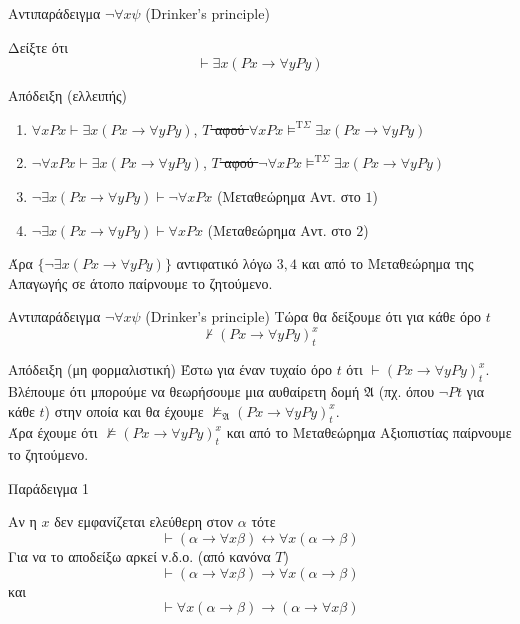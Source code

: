 \documentclass{beamer}
\begin{document}
\begin{frame}{Αντιπαράδειγμα $\neg\forall x \psi$ (Drinker's principle)}
  \begin{block}{}
  Δείξτε ότι
  \[
    \vdash \exists x (Px \rightarrow \forall y Py)
  \]
  \end{block}
  \begin{block}{Απόδειξη (ελλειπής)}
    \begin{enumerate}
      \item $\forall x Px \vdash \exists x (Px \rightarrow \forall y Py)$, \st{$T$ αφού $\forall x Px \models^{\textrm{T}\Sigma} \exists x (Px \rightarrow \forall y Py)$}
      \item $\neg\forall x Px \vdash \exists x (Px \rightarrow \forall y Py)$, \st{$T$ αφού $\neg\forall x Px \models^{\textrm{T}\Sigma} \exists x (Px \rightarrow \forall y Py)$}
      \item $\neg\exists x (Px \rightarrow \forall y Py) \vdash \neg\forall x Px$ (Μεταθεώρημα Αντ. στο $1$)
      \item $\neg\exists x (Px \rightarrow \forall y Py) \vdash \forall x Px$ (Μεταθεώρημα Αντ. στο $2$)
    \end{enumerate}
    Άρα $\{\neg\exists x (Px \rightarrow \forall y Py)\}$ αντιφατικό λόγω $3,4$ και από το Μεταθεώρημα της Απαγωγής σε άτοπο παίρνουμε το ζητούμενο.
  \end{block}
\end{frame}

\begin{frame}{Αντιπαράδειγμα $\neg\forall x \psi$ (Drinker's principle)}
  Τώρα θα δείξουμε ότι για κάθε όρο $t$
  \[
    \nvdash (Px \rightarrow \forall y Py)^x_t
  \]
  \begin{block}{Απόδειξη (μη φορμαλιστική)}
    Έστω για έναν τυχαίο όρο $t$ ότι $\vdash (Px \rightarrow \forall y Py)_t^x$. Βλέπουμε ότι μπορούμε να θεωρήσουμε μια αυθαίρετη δομή $\mathfrak{A}$ (πχ. όπου $\neg Pt$ για κάθε $t$) στην οποία και θα έχουμε $\not\models_\mathfrak{A} (Px \rightarrow \forall y Py)_t^x$.\\
    Άρα έχουμε ότι $\not\models (Px \rightarrow \forall y Py)_t^x$ και από το Μεταθεώρημα Αξιοπιστίας παίρνουμε το ζητούμενο.
  \end{block}
\end{frame}

\begin{frame}{Παράδειγμα 1}
  \begin{block}{}
    Αν η $x$ δεν εμφανίζεται ελεύθερη στον $\alpha$ τότε
    \[
      \vdash (\alpha \rightarrow \forall x \beta) \leftrightarrow \forall x (\alpha \rightarrow \beta)
    \]
    Για να το αποδείξω αρκεί ν.δ.ο. (από κανόνα $T$)
    \[
      \vdash (\alpha \rightarrow \forall x \beta) \rightarrow \forall x (\alpha \rightarrow \beta)
    \]
    και
    \[
      \vdash \forall x (\alpha \rightarrow \beta) \rightarrow (\alpha \rightarrow \forall x \beta)
    \]
  \end{block}
\end{frame}
\end{document}
